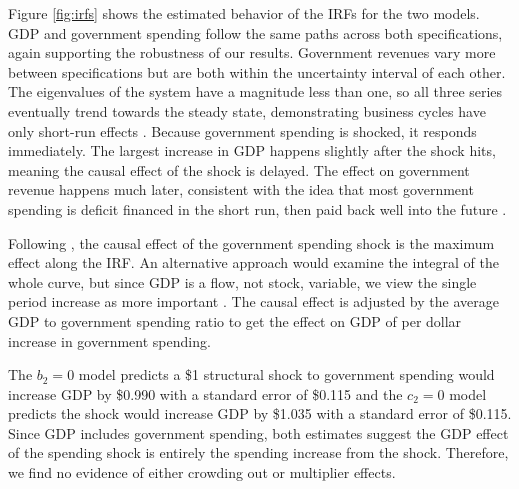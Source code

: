 Figure \ref{fig:irfs} shows the estimated behavior of the IRFs for the two models. GDP and government spending follow the same paths across both specifications, again supporting the robustness of our results. Government revenues vary more between specifications but are both within the uncertainty interval of each other. The eigenvalues of the system have a magnitude less than one, so all three series eventually trend towards the steady state, demonstrating business cycles have only short-run effects \parencite{mitchell2024business}. Because government spending is shocked, it responds immediately. The largest increase in GDP happens slightly after the shock hits, meaning the causal effect of the shock is delayed. The effect on government revenue happens much later, consistent with the idea that most government spending is deficit financed in the short run, then paid back well into the future \parencite{haley1941federal}.

Following \textcite{blanchard2002empirical}, the causal effect of the government spending shock is the maximum effect along the IRF. An alternative approach would examine the integral of the whole curve, but since GDP is a flow, not stock, variable, we view the single period increase as more important \parencite{deleidi2023government}. The causal effect is adjusted by the average GDP to government spending ratio to get the effect on GDP of per dollar increase in government spending.

The $b_2 = 0$ model predicts a \$1 structural shock to government spending would increase GDP by \$0.990 with a standard error of \$0.115 and the $c_2 = 0$ model predicts the shock would increase GDP by \$1.035 with a standard error of \$0.115. Since GDP includes government spending, both estimates suggest the GDP effect of the spending shock is entirely the spending increase from the shock. Therefore, we find no evidence of either crowding out or multiplier effects.
